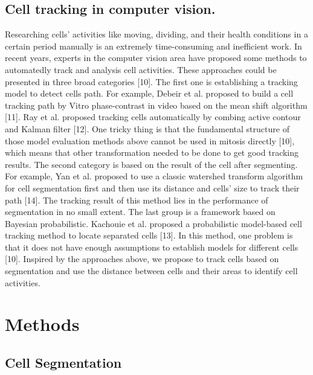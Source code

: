 \documentclass[conference]{IEEEtran}
\begin{document}
\subsection{Cell tracking in computer vision.} Researching cells' activities like moving, dividing, and their health conditions in a certain period manually is an extremely time-consuming and inefficient work. In recent years, experts in the computer vision area have proposed some methods to automatedly track and analysis cell activities. These approaches could be presented in three broad categories [10]. The first one is establishing a tracking model to detect cells path. For example, Debeir et al. proposed to build a cell tracking path by Vitro phase-contrast in video based on the mean shift algorithm [11]. Ray et al. proposed tracking cells automatically by combing active contour and Kalman filter [12]. One tricky thing is that the fundamental structure of those model evaluation methods above cannot be used in mitosis directly [10], which means that other transformation needed to be done to get good tracking results. The second category is based on the result of the cell after segmenting. For example, Yan et al. proposed to use a classic watershed transform algorithm for cell segmentation first and then use its distance and cells' size to track their path [14]. The tracking result of this method lies in the performance of segmentation in no small extent. The last group is a framework based on Bayesian probabilistic. Kachouie et al. proposed a probabilistic model-based cell tracking method to locate separated cells [13]. In this method, one problem is that it does not have enough assumptions to establish models for different cells [10]. Inspired by the approaches above, we propose to track cells based on segmentation and use the distance between cells and their areas to identify cell activities.



\section{Methods}
\subsection{Cell Segmentation}
\end{document}
